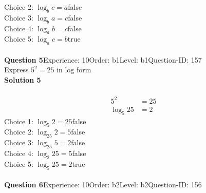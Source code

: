 \documentclass{article}
\begin{document}
Choice 2: \hspace{20pt}$\log_bc=a$\hspace{20pt}false\\
Choice 3: \hspace{20pt}$\log_ba=c$\hspace{20pt}false\\
Choice 4: \hspace{20pt}$\log_ab=c$\hspace{20pt}false\\
Choice 5: \hspace{20pt}$\log_ac=b$\hspace{20pt}true\\
\\[4pt]
\noindent\textbf{Question 5}\hspace{20pt}Experience: 10\hspace{20pt}Order: b1\hspace{20pt}Level: b1\hspace{20pt}Question-ID: 157\\[2pt]
Express $5^2=25$ in log form\\[4pt]
\noindent\textbf{Solution 5}\\[2pt]
\\[-35pt]\begin{align*}
5^2&=25\\[2pt]
\log_{5}25&=2
\end{align*}
Choice 1: \hspace{20pt}$\log_{5}2=25$\hspace{20pt}false\\
Choice 2: \hspace{20pt}$\log_{25}2=5$\hspace{20pt}false\\
Choice 3: \hspace{20pt}$\log_{25}5=2$\hspace{20pt}false\\
Choice 4: \hspace{20pt}$\log_{2}25=5$\hspace{20pt}false\\
Choice 5: \hspace{20pt}$\log_{5}25=2$\hspace{20pt}true\\
\\[4pt]
\noindent\textbf{Question 6}\hspace{20pt}Experience: 10\hspace{20pt}Order: b2\hspace{20pt}Level: b2\hspace{20pt}Question-ID: 156\\[2pt]
\end{document}
